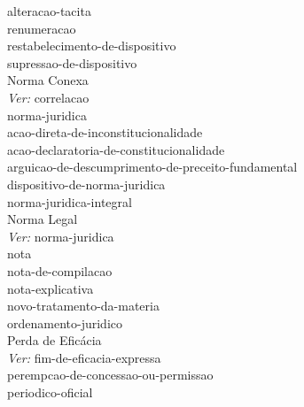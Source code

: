  \hspace*{2.0cm}\glosshsep \Gls{alteracao-tacita} \\ 
 \hspace*{1.0cm}\glosshsep \Gls{renumeracao} \\ 
 \hspace*{1.0cm}\glosshsep \Gls{restabelecimento-de-dispositivo} \\ 
 \hspace*{1.0cm}\glosshsep \Gls{supressao-de-dispositivo} \\ 
Norma Conexa \\ 
 \hspace*{1.0cm}\glosshsep \textit{Ver:} \Gls{correlacao} \\ 
\Gls{norma-juridica} \\ 
 \hspace*{1.0cm}\glosshsep \Gls{acao-direta-de-inconstitucionalidade} \\ 
 \hspace*{1.0cm}\glosshsep \Gls{acao-declaratoria-de-constitucionalidade} \\ 
 \hspace*{1.0cm}\glosshsep \Gls{arguicao-de-descumprimento-de-preceito-fundamental} \\ 
 \hspace*{1.0cm}\glosshsep \Gls{dispositivo-de-norma-juridica} \\ 
 \hspace*{1.0cm}\glosshsep \Gls{norma-juridica-integral} \\ 
Norma Legal \\ 
 \hspace*{1.0cm}\glosshsep \textit{Ver:} \Gls{norma-juridica} \\ 
\Gls{nota} \\ 
 \hspace*{1.0cm}\glosshsep \Gls{nota-de-compilacao} \\ 
 \hspace*{1.0cm}\glosshsep \Gls{nota-explicativa} \\ 
\Gls{novo-tratamento-da-materia} \\ 
\Gls{ordenamento-juridico} \\ 
Perda de Eficácia \\ 
 \hspace*{1.0cm}\glosshsep \textit{Ver:} \Gls{fim-de-eficacia-expressa} \\ 
\Gls{perempcao-de-concessao-ou-permissao} \\ 
\Gls{periodico-oficial} \\ 
